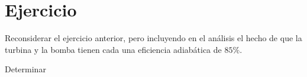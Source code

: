 \section{Ejercicio}\label{ej:Chap10Ejercicio07}
Reconsiderar el ejercicio anterior, pero incluyendo en el análisis el hecho de que la turbina y la bomba tienen cada una eficiencia adiabática de $85\%$.

Determinar

